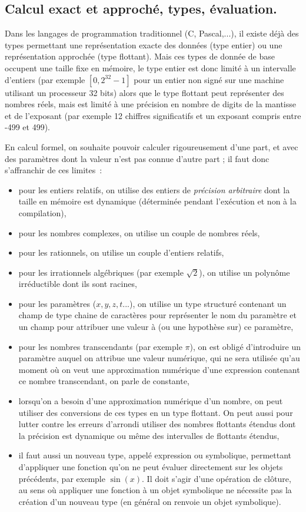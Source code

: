 \documentclass[a4paper,11pt]{article}
\begin{document}
\subsection{Calcul exact et approché, types, évaluation.}
Dans les langages de programmation traditionnel (C, Pascal,...), il existe 
déjà des types permettant une représentation 
exacte des données (type entier) ou une représentation approchée 
(type flottant). Mais ces types de donnée de base 
occupent une taille fixe en mémoire, le type entier est donc
limité à un intervalle d'entiers (par exemple $[0,2^{32}-1]$ pour un entier
non signé sur une machine utilisant un processeur 32 bits) alors que le 
type flottant peut représenter des nombres réels, mais est 
limité à une précision en nombre de digits de la mantisse et de l'exposant 
(par exemple 12 chiffres significatifs et un 
exposant compris entre -499 et 499). 

En calcul formel, on souhaite pouvoir calculer rigoureusement d'une part, 
et avec des param\`etres dont la valeur n'est 
pas connue d'autre part ; il faut donc s'affranchir de ces limites~: 
\begin{itemize}
\item pour les entiers relatifs, on utilise des entiers de 
{\em précision arbitraire}
dont la taille en mémoire est dynamique (déterminée pendant l'exécution et non
à la compilation),
\item pour les nombres complexes, on utilise un couple de nombres réels,
\item pour les rationnels, on utilise un couple d'entiers relatifs,
\item pour les irrationnels algébriques (par exemple $\sqrt{2}$), 
on utilise un polyn\^ome irréductible dont ils sont racines,
\item pour les param\`etres ($x,y,z,t...$), on utilise un type 
structuré contenant un champ de type chaine de caract\`eres pour 
repr\'esenter le nom du param\`etre et
un champ pour attribuer une valeur à (ou une hypoth\`ese sur) ce param\`etre,
\item pour les nombres transcendants (par exemple $\pi$), on est obligé
d'introduire un paramètre auquel on attribue une valeur numérique, 
qui ne sera utilisée qu'au moment où on veut une 
approximation numérique d'une expression contenant ce nombre transcendant,
on parle de constante,
\item lorsqu'on a besoin d'une approximation numérique d'un nombre,
on peut utiliser des conversions de ces types en un type flottant. On peut 
aussi pour lutter contre les erreurs 
d'arrondi utiliser des nombres flottants étendus dont la précision est 
dynamique ou même des intervalles de flottants étendus,
\item il faut aussi
un nouveau type, appelé expression ou symbolique, permettant d'appliquer
une fonction qu'on ne peut évaluer directement sur les objets pr\'ec\'edents,
par exemple $\sin(x)$. Il
doit s'agir d'une op\'eration de clôture, au sens où appliquer une fonction \`a
un objet symbolique ne nécessite pas la création d'un nouveau type
(en général on renvoie un objet symbolique).
\end{itemize}
\end{document}
